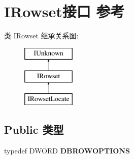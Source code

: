 \hypertarget{interface_i_rowset}{}\section{I\+Rowset接口 参考}
\label{interface_i_rowset}
类 I\+Rowset 继承关系图\+:\begin{figure}[H]
\begin{center}
\leavevmode
\includegraphics[height=3.000000cm]{interface_i_rowset}
\end{center}
\end{figure}
\subsection*{Public 类型}
\begin{DoxyCompactItemize}
\item 
\mbox{\label{interface_i_rowset_a104a16800197c7760adb7f34a9fb3b3b}} 
typedef D\+W\+O\+RD {\bfseries D\+B\+R\+O\+W\+O\+P\+T\+I\+O\+NS}
\end{DoxyCompactItemize}

